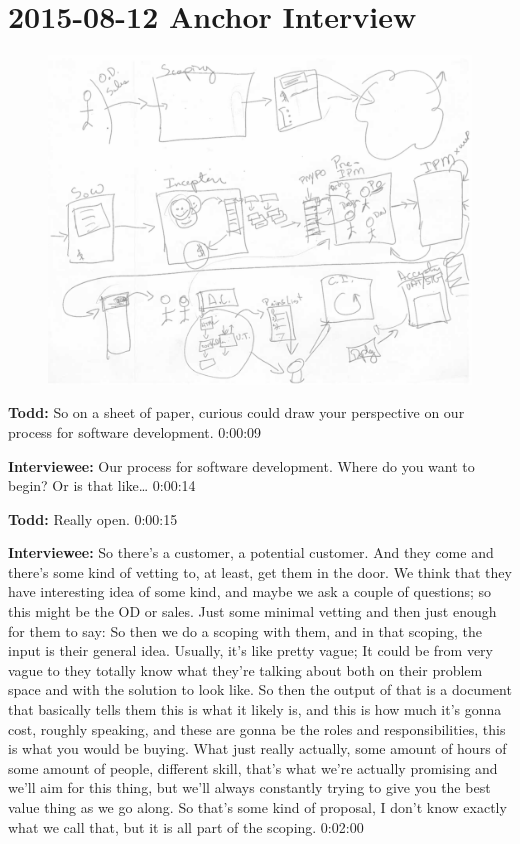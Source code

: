 \section{2015-08-12 Anchor Interview}

\begin{figure}[h]
\centering
\includegraphics[width=6.5in]{interviews/drawings/2015_08_12_anchor.png}
\caption{}
\label{2015_08_12_anchor}
\end{figure}

\textbf{Todd:} 	So on a sheet of paper, curious could draw your perspective on our process for software development. 0:00:09

\textbf{Interviewee:}  	Our process for software development.  Where do you want to begin?  Or is that like…  0:00:14

\textbf{Todd:}   Really open.  0:00:15

\textbf{Interviewee:}  	So there's a customer, a potential customer.  And they come and there's some kind of vetting to, at least, get them in the door.  We think that they have interesting idea of some kind, and maybe we ask a couple of questions; so this might be the OD or sales.  Just some minimal vetting and then just enough for them to say:   So then we do a scoping with them, and in that scoping, the input is their general idea.  Usually, it's like pretty vague; It could be from very vague to they totally know what they're talking about both on their problem space and with the solution to look like.  So then the output of that is a document that basically tells them this is what it likely is, and this is how much it's gonna cost, roughly speaking, and these are gonna be the roles and responsibilities, this is what you would be buying.  What just really actually, some amount of hours of some amount of people, different skill, that's what we're actually promising and we'll aim for this thing, but we'll always constantly trying to give you the best value thing as we go along.  So that's some kind of proposal, I don't know exactly what we call that, but it is all part of the scoping.  0:02:00

